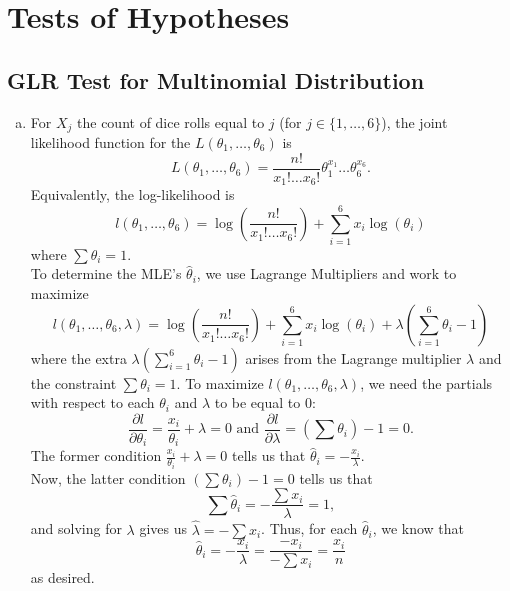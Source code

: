 \newpage
\setcounter{section}{5}
\section{Tests of Hypotheses}
\subsection{GLR Test for Multinomial Distribution}

\begin{enumerate}[a)]
    \item For $X_j$ the count of dice rolls equal to $j$ (for $j \in \{ 1, \dots, 6 \}$), the joint likelihood function for the $L(\theta_1, \dots, \theta_6)$ is
    \[
        L(\theta_1, \dots, \theta_6) = \frac{n!}{x_1! \dots x_6!}\theta_1^{x_1} \dots \theta_6^{x_6}.
    \]
    Equivalently, the log-likelihood is
    \[
        l(\theta_1, \dots, \theta_6) = \log \left(\frac{n!}{x_1! \dots x_6!}\right) + \sum_{i=1}^6 x_i \log(\theta_i)
    \]
    where $\sum \theta_i = 1$. \\

    To determine the MLE's $\hat{\theta}_i$, we use Lagrange Multipliers and work to maximize
    \[
        l(\theta_1, \dots, \theta_6, \lambda) = \log \left(\frac{n!}{x_1! \dots x_6!}\right) + \sum_{i=1}^6 x_i \log(\theta_i) + \lambda\left(\sum_{i=1}^6 \theta_i - 1\right)
    \]
    where the extra $\lambda(\sum_{i=1}^6 \theta_i - 1)$ arises from the Lagrange multiplier $\lambda$ and the constraint $\sum \theta_i = 1$. To maximize $l(\theta_1, \dots, \theta_6, \lambda)$, we need the partials with respect
    to each $\theta_i$ and $\lambda$ to be equal to $0$:
    \[
        \frac{\partial l}{\partial \theta_i} = \frac{x_i}{\theta_i} + \lambda = 0 \text{ and } \frac{\partial l}{\partial \lambda} = \left(\sum \theta_i \right) - 1 = 0.
    \]
    The former condition $\frac{x_i}{\theta_i} + \lambda = 0$ tells us that $\hat{\theta}_i = -\frac{x_i}{\lambda}$. \\
    
    Now, the latter condition $\left(\sum \theta_i \right) - 1 = 0$ tells us that
    \[
        \sum \hat{\theta}_i = - \frac{\sum x_i}{\lambda} = 1,
    \]
    and solving for $\lambda$ gives us $\hat{\lambda} = - \sum x_i$. Thus, for each $\hat{\theta}_i$, we know that
    \[
        \hat{\theta}_i = -\frac{x_i}{\lambda} = \frac{-x_i}{- \sum x_i} = \frac{x_i}{n}
    \]    
    as desired.


\end{enumerate}
